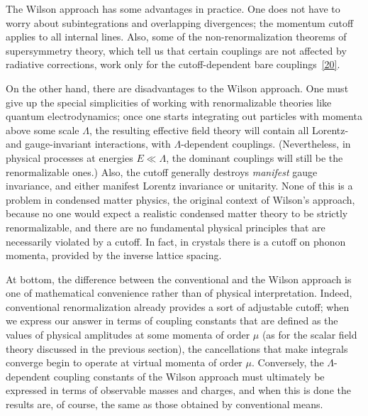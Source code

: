 The Wilson approach has some advantages in practice. One does not have to
worry about subintegrations and overlapping divergences; the momentum cutoff
applies to all internal lines. Also, some of the non-renormalization theorems
of supersymmetry theory, which tell us that certain couplings are not affected
by radiative corrections, work only for the cutoff-dependent bare
couplings~\hyperref[ref:12.20]{[20]}.

On the other hand, there are disadvantages to the Wilson approach. One must
give up the special simplicities of working with renormalizable theories like
quantum electrodynamics; once one starts integrating out particles with
momenta above some scale $\Lambda$, the resulting effective field theory will
contain all Lorentz- and gauge-invariant interactions, with $\Lambda$-dependent
couplings. (Nevertheless, in physical processes at energies $E\ll\Lambda$,
the dominant couplings will still be the renormalizable ones.) Also, the
cutoff generally destroys \emph{manifest} gauge invariance, and either manifest
Lorentz invariance or unitarity. None of this is a problem in condensed matter
physics, the original context of Wilson's approach, because no one would
expect a realistic condensed matter theory to be strictly renormalizable, and
there are no fundamental physical principles that are necessarily violated by
a cutoff. In fact, in crystals there is a cutoff on phonon momenta, provided by
the inverse lattice spacing.

At bottom, the difference between the conventional and the Wilson approach is
one of mathematical convenience rather than of physical interpretation.
Indeed, conventional renormalization already provides a sort of adjustable
cutoff; when we express our answer in terms of coupling constants that are
defined as the values of physical amplitudes at some momenta of order $\mu$
(as for the scalar field theory discussed in the previous section), the
cancellations that make integrals converge begin to operate at virtual momenta
of order $\mu$. Conversely, the $\Lambda$-dependent coupling constants of the
Wilson approach must ultimately be expressed in terms of observable masses and
charges, and when this is done the results are, of course, the same as those
obtained by conventional means.

